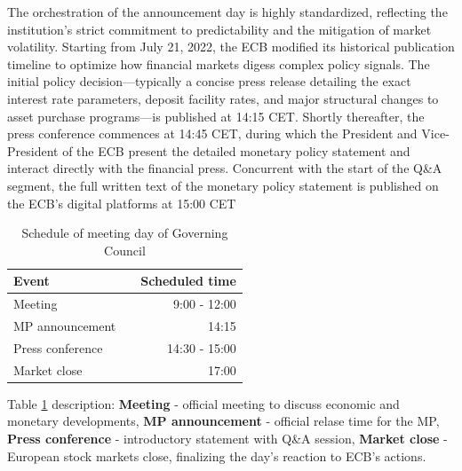The orchestration of the announcement day is highly standardized, reflecting the institution's strict commitment to predictability and the mitigation
of market volatility. Starting from July 21, 2022, the ECB modified its historical publication timeline to optimize how financial markets digess
complex policy signals. The initial policy decision—typically a concise press release detailing the exact interest rate parameters, deposit
facility rates, and major structural changes to asset purchase programs—is published at 14:15 CET. Shortly thereafter, the press conference commences
at 14:45 CET, during which the President and Vice-President of the ECB present the detailed monetary policy statement and interact directly with
the financial press. Concurrent with the start of the Q\&A segment, the full written text of the monetary policy statement is published on the ECB's
digital platforms at 15:00 CET

\begin{table}[h!]
\caption[Governing Council Meeting Day Schedule]
{Schedule of meeting day of Governing Council}
\label{tab:meet_schedule}
\begin{center}
\begin{tabular}{lcr}
\hline 
Event&& Scheduled time\\
\hline
Meeting && 9:00 - 12:00\\
MP announcement && 14:15\\
Press conference && 14:30 - 15:00\\
Market close && 17:00\\
\hline
\end{tabular}
\end{center}
\end{table}

Table \ref{tab:meet_schedule} description: \textbf{Meeting} - official meeting to discuss economic and monetary developments,
\textbf{MP announcement} - official relase time for the MP, \textbf{Press conference} - introductory statement with Q\&A session, 
\textbf{Market close} - European stock markets close, finalizing the day's reaction to ECB's actions.